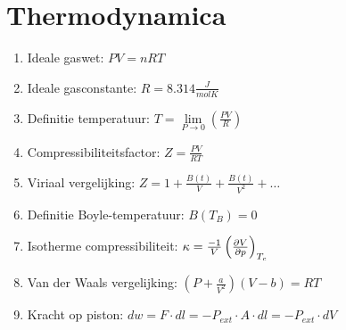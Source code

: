 \documentclass[12pt]{article}
\begin{document}
    \maketitle

	\section{Thermodynamica}%
	\label{sec:Thermodynamica}
	\begin{enumerate}
		\item Ideale gaswet: $ PV = nRT $
		\item Ideale gasconstante:  $ R = 8.314 \frac{J}{mol K} $
		\item Definitie temperatuur: $ T = \lim\limits_{P \to 0} \left(\frac{PV}{R}\right) $
		\item Compressibiliteitsfactor: $ Z = \frac{PV}{RT} $
		\item Viriaal vergelijking:  $ Z = 1 + \frac{B(t)}{V} + \frac{B(t)}{V^2} + \dots $
		\item Definitie Boyle-temperatuur: $ B(T_B) = 0 $
		\item Isotherme compressibiliteit:  $ \kappa = \frac{-1}{V}\left( \pdv{V}{p} \right)_{T_c} $
		\item Van der Waals vergelijking: $ (P + \frac{a}{V^2})(V-b) = RT $
		\item Kracht op piston:  $ dw = F\cdot dl = -P_{ext}\cdot A\cdot dl = -P_{ext}\cdot dV$
	\end{enumerate}
\end{document}
